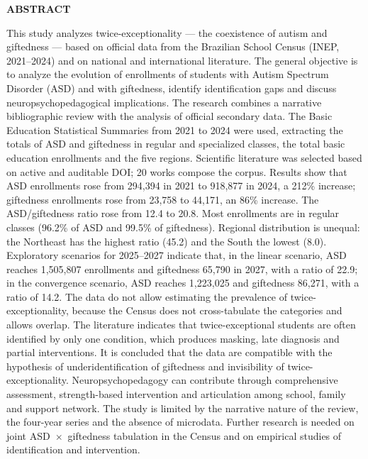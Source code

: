 \clearpage

\begin{center}
\textbf{ABSTRACT}
\end{center}

\begingroup
{}
\noindent
This study analyzes twice-exceptionality --- the coexistence of autism and giftedness --- based on official data from the Brazilian School Census (INEP, 2021--2024) and on national and international literature. The general objective is to analyze the evolution of enrollments of students with Autism Spectrum Disorder (ASD) and with giftedness, identify identification gaps and discuss neuropsychopedagogical implications. The research combines a narrative bibliographic review with the analysis of official secondary data. The Basic Education Statistical Summaries from 2021 to 2024 were used, extracting the totals of ASD and giftedness in regular and specialized classes, the total basic education enrollments and the five regions. Scientific literature was selected based on active and auditable DOI; 20 works compose the corpus. Results show that ASD enrollments rose from 294,394 in 2021 to 918,877 in 2024, a 212\% increase; giftedness enrollments rose from 23,758 to 44,171, an 86\% increase. The ASD/giftedness ratio rose from 12.4 to 20.8. Most enrollments are in regular classes (96.2\% of ASD and 99.5\% of giftedness). Regional distribution is unequal: the Northeast has the highest ratio (45.2) and the South the lowest (8.0). Exploratory scenarios for 2025--2027 indicate that, in the linear scenario, ASD reaches 1,505,807 enrollments and giftedness 65,790 in 2027, with a ratio of 22.9; in the convergence scenario, ASD reaches 1,223,025 and giftedness 86,271, with a ratio of 14.2. The data do not allow estimating the prevalence of twice-exceptionality, because the Census does not cross-tabulate the categories and allows overlap. The literature indicates that twice-exceptional students are often identified by only one condition, which produces masking, late diagnosis and partial interventions. It is concluded that the data are compatible with the hypothesis of underidentification of giftedness and invisibility of twice-exceptionality. Neuropsychopedagogy can contribute through comprehensive assessment, strength-based intervention and articulation among school, family and support network. The study is limited by the narrative nature of the review, the four-year series and the absence of microdata. Further research is needed on joint ASD~$\times$~giftedness tabulation in the Census and on empirical studies of identification and intervention.

